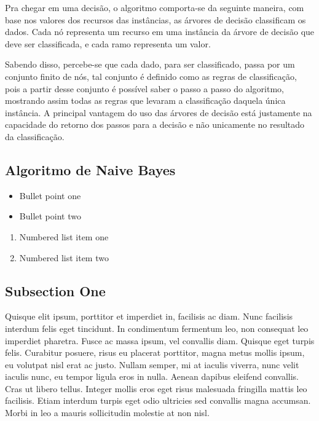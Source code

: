 \documentclass[preprint,12pt]{elsarticle}
\begin{document}
	Pra chegar em uma decis\~ao, o algoritmo comporta-se da seguinte maneira, com base nos valores dos recursos das inst\^ancias, as \'arvores de decis\~ao classificam os dados. Cada n\'o representa um recurso em uma inst\^ancia da \'arvore de decis\~ao que deve ser classificada, e cada ramo representa um valor\cite{Pandya:2015}.
	
	Sabendo disso, percebe-se que cada dado, para ser classificado, passa por um conjunto finito de n\'os, tal conjunto \'e definido como as regras de classifica\c c\~ao, pois a partir desse conjunto \'e poss\'ivel saber o passo a passo do algoritmo, mostrando assim todas as regras que levaram a classifica\c c\~ao daquela \'unica inst\^ancia. A principal vantagem do uso das \'arvores de decis\~ao est\'a justamente na capacidade do retorno dos passos para a decis\~ao e n\~ao unicamente no resultado da classifica\c c\~ao.
	
	\subsection{Algoritmo de Naive Bayes}
	
	
	
	\begin{itemize}
		\item Bullet point one
		\item Bullet point two
	\end{itemize}
	
	\begin{enumerate}
		\item Numbered list item one
		\item Numbered list item two
	\end{enumerate}
	
	\subsection{Subsection One}
	
	Quisque elit ipsum, porttitor et imperdiet in, facilisis ac diam. Nunc facilisis interdum felis eget tincidunt. In condimentum fermentum leo, non consequat leo imperdiet pharetra. Fusce ac massa ipsum, vel convallis diam. Quisque eget turpis felis. Curabitur posuere, risus eu placerat porttitor, magna metus mollis ipsum, eu volutpat nisl erat ac justo. Nullam semper, mi at iaculis viverra, nunc velit iaculis nunc, eu tempor ligula eros in nulla. Aenean dapibus eleifend convallis. Cras ut libero tellus. Integer mollis eros eget risus malesuada fringilla mattis leo facilisis. Etiam interdum turpis eget odio ultricies sed convallis magna accumsan. Morbi in leo a mauris sollicitudin molestie at non nisl.
	
\end{document}
